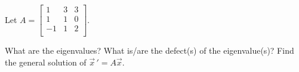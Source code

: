 \documentclass{ximera}
\begin{document}
\begin{exercise}%
    Let $A =
    \left[ 
        \begin{smallmatrix}
            1 & 3 & 3 \\
            1 & 1 & 0 \\
            -1 & 1 & 2 \\
        \end{smallmatrix}
    \right]$.  
    \begin{tasks}
        \task What are the eigenvalues?
        \task What is/are the defect(s) of the eigenvalue(s)?
        \task Find the general solution of $\vec{x}\,' = A\vec{x}$.
    \end{tasks}
\end{exercise}
\end{document}

